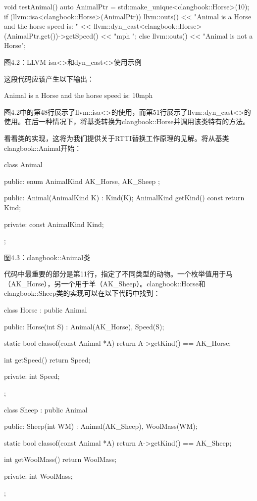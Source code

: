 \begin{cpp}
void testAnimal() {
  auto AnimalPtr = std::make_unique<clangbook::Horse>(10);
  if (llvm::isa<clangbook::Horse>(AnimalPtr)) {
    llvm::outs()
      << "Animal is a Horse and the horse speed is: "
      << llvm::dyn_cast<clangbook::Horse>(AnimalPtr.get())->getSpeed()
      << "mph \n";
  } else {
    llvm::outs() << "Animal is not a Horse\n";
  }
}
\end{cpp}

\begin{center}
图4.2：LLVM isa<>和dyn\_cast<>使用示例
\end{center}

这段代码应该产生以下输出：

\begin{shell}
Animal is a Horse and the horse speed is: 10mph
\end{shell}

图4.2中的第48行展示了llvm::isa<>的使用，而第51行展示了llvm::dyn\_cast<>的使用。在后一种情况下，将基类转换为clangbook::Horse并调用该类特有的方法。

看看类的实现，这将为我们提供关于RTTI替换工作原理的见解。将从基类clangbook::Animal开始：

\begin{cpp}
class Animal {
public:
  enum AnimalKind { AK_Horse, AK_Sheep };

public:
  Animal(AnimalKind K) : Kind(K){};
  AnimalKind getKind() const { return Kind; }

private:
  const AnimalKind Kind;
};
\end{cpp}

\begin{center}
图4.3：clangbook::Animal类
\end{center}

代码中最重要的部分是第11行，指定了不同类型的动物。一个枚举值用于马（AK\_Horse），另一个用于羊（AK\_Sheep）。clangbook::Horse和clangbook::Sheep类的实现可以在以下代码中找到：

\begin{cpp}
class Horse : public Animal {
public:
  Horse(int S) : Animal(AK_Horse), Speed(S){};

  static bool classof(const Animal *A) { return A->getKind() == AK_Horse; }

  int getSpeed() { return Speed; }

private:
  int Speed;
};

class Sheep : public Animal {
public:
  Sheep(int WM) : Animal(AK_Sheep), WoolMass(WM){};

  static bool classof(const Animal *A) { return A->getKind() == AK_Sheep; }

  int getWoolMass() { return WoolMass; }

private:
  int WoolMass;
};
\end{cpp}

